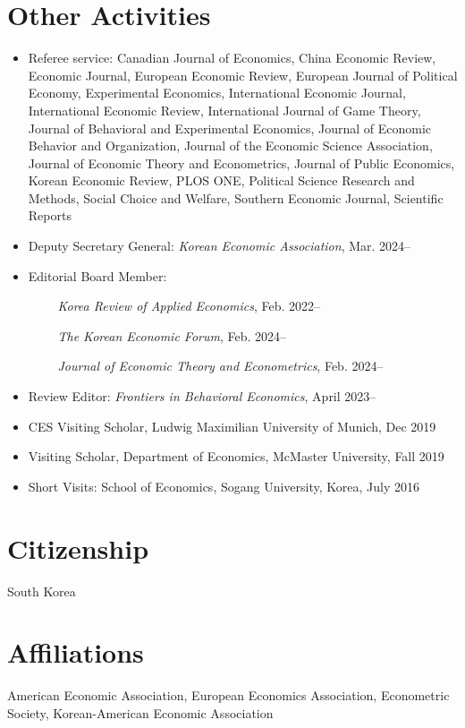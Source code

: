 \documentclass[margin, a4paper]{res}
\begin{document}
\begin{resume}
\section{Other Activities}
\begin{itemize}[leftmargin=*]
\item Referee service: Canadian Journal of Economics, China Economic Review, Economic Journal, European Economic Review, European Journal of Political Economy, Experimental Economics, International Economic Journal, International Economic Review, International Journal of Game Theory, Journal of Behavioral and Experimental Economics, Journal of Economic Behavior and Organization, Journal of the Economic Science Association, Journal of Economic Theory and Econometrics, Journal of Public Economics, Korean Economic Review, PLOS ONE, Political Science Research and Methods, Social Choice and Welfare, Southern Economic Journal, Scientific Reports
\item Deputy Secretary General: \emph{Korean Economic Association}, Mar. 2024--
\item Editorial Board Member: 

$\qquad$ \emph{Korea Review of Applied Economics}, Feb. 2022--

$\qquad$ \emph{The Korean Economic Forum}, Feb. 2024--

$\qquad$ \emph{Journal of Economic Theory and Econometrics}, Feb. 2024--

\item Review Editor: \emph{Frontiers in Behavioral Economics}, April 2023--
\item CES Visiting Scholar, Ludwig Maximilian University of Munich, Dec 2019
\item Visiting Scholar, Department of Economics, McMaster University, Fall 2019
\item Short Visits: School of Economics, Sogang University, Korea, July 2016
\end{itemize}

\section{Citizenship} South Korea %

\section{Affiliations} American Economic Association, European Economics Association, Econometric Society, Korean-American Economic Association


\end{resume}
\end{document}
